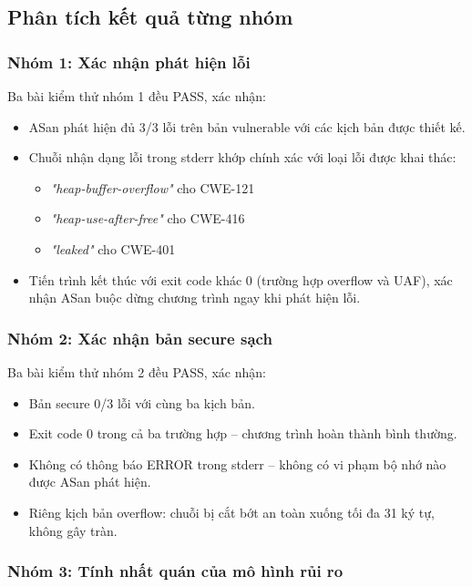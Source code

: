 \subsection{Phân tích kết quả từng nhóm}

\subsubsection{Nhóm 1: Xác nhận phát hiện lỗi}

Ba bài kiểm thử nhóm 1 đều PASS, xác nhận:
\begin{itemize}
    \item ASan phát hiện đủ 3/3 lỗi trên bản vulnerable với các kịch bản được
          thiết kế.
    \item Chuỗi nhận dạng lỗi trong stderr khớp chính xác với loại lỗi được
          khai thác:
          \begin{itemize}
              \item \textit{"heap-buffer-overflow"} cho CWE-121
              \item \textit{"heap-use-after-free"} cho CWE-416
              \item \textit{"leaked"} cho CWE-401
          \end{itemize}
    \item Tiến trình kết thúc với exit code khác 0 (trường hợp overflow và UAF),
          xác nhận ASan buộc dừng chương trình ngay khi phát hiện lỗi.
\end{itemize}

\subsubsection{Nhóm 2: Xác nhận bản secure sạch}

Ba bài kiểm thử nhóm 2 đều PASS, xác nhận:
\begin{itemize}
    \item Bản secure 0/3 lỗi với cùng ba kịch bản.
    \item Exit code 0 trong cả ba trường hợp -- chương trình hoàn thành bình
          thường.
    \item Không có thông báo ERROR trong stderr -- không có vi phạm bộ nhớ nào
          được ASan phát hiện.
    \item Riêng kịch bản overflow: chuỗi bị cắt bớt an toàn xuống tối đa 31
          ký tự, không gây tràn.
\end{itemize}

\subsubsection{Nhóm 3: Tính nhất quán của mô hình rủi ro}

